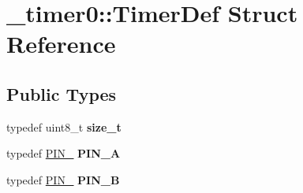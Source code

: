 \hypertarget{struct__timer0_1_1TimerDef}{}\section{\+\_\+timer0\+:\+:Timer\+Def Struct Reference}
\label{struct__timer0_1_1TimerDef}
\subsection*{Public Types}
\begin{DoxyCompactItemize}
\item 
typedef uint8\+\_\+t {\bfseries size\+\_\+t}\hypertarget{struct__timer0_1_1TimerDef_ac97e10949ae7dd8703568e7accb4346c}{}\label{struct__timer0_1_1TimerDef_ac97e10949ae7dd8703568e7accb4346c}

\item 
typedef \hyperlink{structports_1_1Pin}{P\+I\+N\+\_} {\bfseries P\+I\+N\+\_\+A}\hypertarget{struct__timer0_1_1TimerDef_ab4f68d388e3b8fdd3e07032692c793a4}{}\label{struct__timer0_1_1TimerDef_ab4f68d388e3b8fdd3e07032692c793a4}

\item 
typedef \hyperlink{structports_1_1Pin}{P\+I\+N\+\_} {\bfseries P\+I\+N\+\_\+B}\hypertarget{struct__timer0_1_1TimerDef_acb1e52236e26a885f377ab78b88cfc9c}{}\label{struct__timer0_1_1TimerDef_acb1e52236e26a885f377ab78b88cfc9c}

\end{DoxyCompactItemize}
